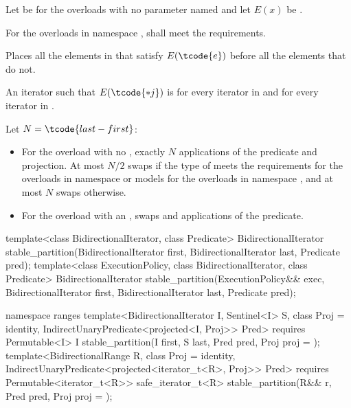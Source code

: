 \begin{itemdescr}
\pnum
Let  be 
for the overloads with no parameter named 
and let $E(x)$ be .

\pnum
\requires
For the overloads in namespace ,
 shall meet
the  requirements.

\pnum
\effects
Places all the elements  in 
that satisfy $E(\tcode{e})$ before all the elements that do not.

\pnum
\returns
An iterator  such that $E(\tcode{*j})$ is
 for every iterator  in  and
 for every iterator  in .

\pnum
\complexity Let $N = \tcode{last - first}$:
\begin{itemize}
\item
  For the overload with no ,
  exactly $N$ applications of the predicate and projection.
  At most $N / 2$ swaps if the type of  meets
  the  requirements
  for the overloads in namespace  or
  models 
  for the overloads in namespace ,
  and at most $N$ swaps otherwise.
\item
  For the overload with an ,
   swaps and  applications of the predicate.
\end{itemize}

\end{itemdescr}

%
\begin{itemdecl}
template<class BidirectionalIterator, class Predicate>
  BidirectionalIterator
    stable_partition(BidirectionalIterator first, BidirectionalIterator last, Predicate pred);
template<class ExecutionPolicy, class BidirectionalIterator, class Predicate>
  BidirectionalIterator
    stable_partition(ExecutionPolicy&& exec,
                     BidirectionalIterator first, BidirectionalIterator last, Predicate pred);

namespace ranges {
  template<BidirectionalIterator I, Sentinel<I> S, class Proj = identity,
           IndirectUnaryPredicate<projected<I, Proj>> Pred>
    requires Permutable<I>
    I stable_partition(I first, S last, Pred pred, Proj proj = {});
  template<BidirectionalRange R, class Proj = identity,
           IndirectUnaryPredicate<projected<iterator_t<R>, Proj>> Pred>
    requires Permutable<iterator_t<R>>
    safe_iterator_t<R> stable_partition(R&& r, Pred pred, Proj proj = {});
}
\end{itemdecl}

